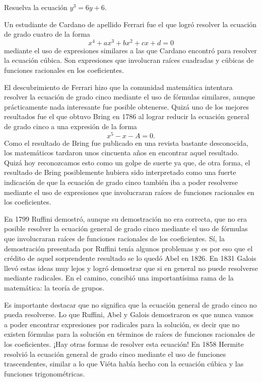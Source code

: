 \begin{exercise}
	Resuelva la ecuación $y^3=6y+6$.	
\end{exercise}


Un estudiante de Cardano de apellido Ferrari fue el que logró resolver la
ecuación de grado cuatro de la forma
\[
	x^4+ax^3+bx^2+cx+d=0
\]
mediante el uso de expresiones similares a las que Cardano encontró para
resolver la ecuación cúbica. Son expresiones que involucran raíces cuadradas y
cúbicas de funciones racionales en los coeficientes. 

El descubrimiento de Ferrari hizo que la comunidad matemática intentara
resolver la ecuación de grado cinco mediante el uso de fórmulas similares, aunque
prácticamente nada interesante fue posible obtenerse. 
Quizá uno de los mejores resultados fue el que obtuvo Bring en 1786 al lograr 
reducir la ecuación general de grado cinco a una expresión de la forma
\[
	x^5-x-A=0.
\]
Como el resultado de Bring fue publicado en una revista bastante desconocida,
los matemáticos tardaron unos cincuenta años en encontrar aquel resultado.
Quizá hoy reconozcamos esto como un golpe de suerte ya que, de otra forma, el
resultado de Bring posiblemente hubiera sido interpretado como una fuerte
indicación de que la ecuación de grado cinco también iba a poder resolverse
mediante el uso de expresiones que involucraran raíces de funciones racionales
en los coeficientes.

En 1799 Ruffini demostró, aunque su demostración no era correcta, que no era
posible resolver la ecuación general de grado cinco mediante el uso de fórmulas
que involucraran raíces de funciones racionales de los coeficientes. Sí, la
demostración presentada por Ruffini tenía algunos problemas y es por eso que el
crédito de aquel sorprendente resultado se lo quedó Abel en 1826.  En 1831
Galois llevó estas ideas muy lejos y logró demostrar que si en general no puede
resolverse mediante radicales. En el camino, concibió una importantísima rama
de la matemática: la teoría de grupos.

Es importante destacar que no significa que la ecuación general de grado cinco
no pueda resolverse. Lo que Ruffini, Abel y Galois demostraron es que nunca
vamos a poder encontrar expresiones por radicales para la solución, es decir
que no existen fórmulas para la solución en términos de raíces de funciones
racionales de los coeficientes. ¡Hay otras formas de resolver esta ecuación!
En 1858 Hermite resolvió la ecuación general de grado cinco mediante el uso de
funciones trascendentes, similar a lo que Viéta había hecho con la ecuación
cúbica y las funciones trigonométricas. 

